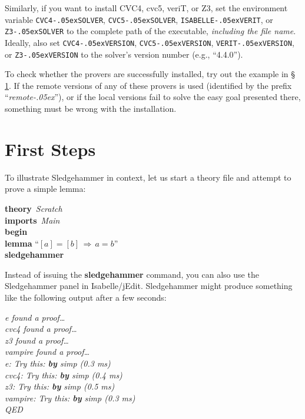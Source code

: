 \documentclass[a4paper,12pt]{article}
\let\oldS=\S
\def\S{\oldS\,}
\renewcommand\_{\hbox{\textunderscore\kern-.05ex}}
\begin{document}
\begin{sloppy}
\begin{enum}
Similarly, if you want to install CVC4, cvc5, veriT, or Z3, set the environment
variable \texttt{CVC4\_\allowbreak SOLVER}, \texttt{CVC5\_\allowbreak SOLVER},
\texttt{ISABELLE\_\allowbreak VERIT},
or \texttt{Z3\_SOLVER} to the complete path of the executable, \emph{including
the file name}. Ideally, also set \texttt{CVC4\_VERSION}, \texttt{CVC5\_VERSION},
\texttt{VERIT\_VERSION}, or \texttt{Z3\_VERSION} to the solver's version number
(e.g., ``4.4.0'').
\end{enum}
\end{sloppy}

To check whether the provers are successfully installed, try out the example
in \S\ref{first-steps}. If the remote versions of any of these provers is used
(identified by the prefix ``\textit{remote\_\/}''), or if the local versions
fail to solve the easy goal presented there, something must be wrong with the
installation.


\section{First Steps}
\label{first-steps}

To illustrate Sledgehammer in context, let us start a theory file and
attempt to prove a simple lemma:

\prew
\textbf{theory}~\textit{Scratch} \\
\noindent\hbox{}\quad \textbf{imports}~\textit{Main} \\
\textbf{begin} \\[2\smallskipamount]
%
\textbf{lemma} ``$[a] = [b] \,\Longrightarrow\, a = b$'' \\
\textbf{sledgehammer}
\postw

Instead of issuing the \textbf{sledgehammer} command, you can also use the
Sledgehammer panel in Isabelle/jEdit. Sledgehammer might produce something like
the following output after a few seconds:

\prew
\slshape
e found a proof\ldots \\
cvc4 found a proof\ldots \\
z3 found a proof\ldots \\
vampire found a proof\ldots \\
e: Try this: \textbf{by} \textit{simp} (0.3 ms) \\
cvc4: Try this: \textbf{by} \textit{simp} (0.4 ms) \\
z3: Try this: \textbf{by} \textit{simp} (0.5 ms) \\
vampire: Try this: \textbf{by} \textit{simp} (0.3 ms) \\
QED
\postw
\end{document}
